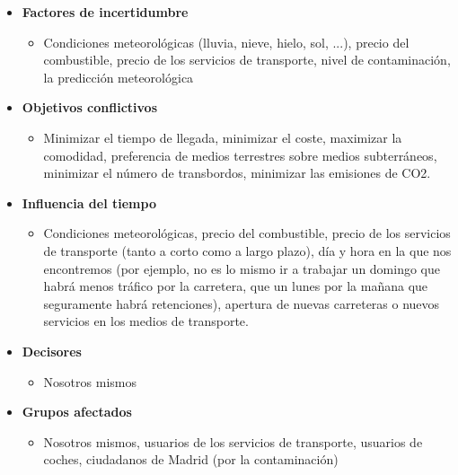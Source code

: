 \documentclass[12pt,a4paper,twoside,openright,titlepage,final]{article}
\begin{document}
\begin{itemize}
	
	\item \textbf{Factores de incertidumbre}
	
	\begin{itemize}
		\item Condiciones meteorológicas (lluvia, nieve, hielo, sol, ...), precio del combustible, precio de los servicios de transporte, nivel de contaminación, la predicción meteorológica
	\end{itemize}
	
	\item \textbf{Objetivos conflictivos}
	
	\begin{itemize}
		\item Minimizar el tiempo de llegada, minimizar el coste, maximizar la comodidad, preferencia de medios terrestres sobre medios subterráneos, minimizar el número de transbordos, minimizar las emisiones de CO2.
	\end{itemize}
	
	\item \textbf{Influencia del tiempo}
	
	\begin{itemize}
		\item Condiciones meteorológicas, precio del combustible, precio de los servicios de transporte (tanto a corto como a largo plazo), día y hora en la que nos encontremos (por ejemplo, no es lo mismo ir a trabajar un domingo que habrá menos tráfico por la carretera, que un lunes por la mañana que seguramente habrá retenciones), apertura de nuevas carreteras o nuevos servicios en los medios de transporte.
	\end{itemize}
	
	\item \textbf{Decisores}
	
	\begin{itemize}
		\item Nosotros mismos
	\end{itemize}
	
	\item \textbf{Grupos afectados}
	
	\begin{itemize}
		\item Nosotros mismos, usuarios de los servicios de transporte, usuarios de coches, ciudadanos de Madrid (por la contaminación)
	\end{itemize}
\end{itemize}
\end{document}
